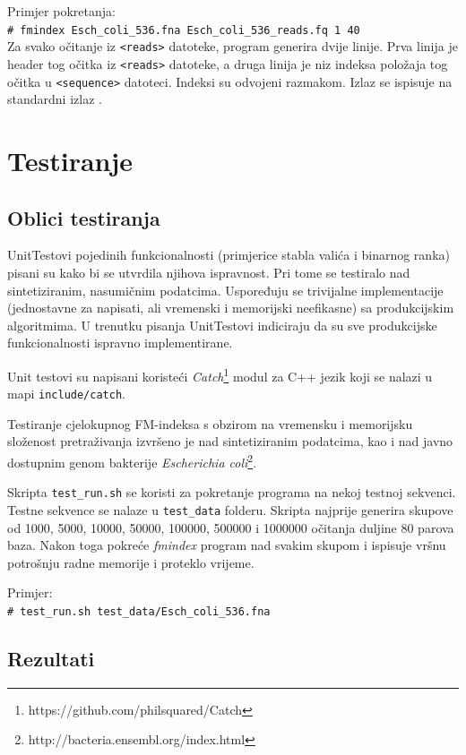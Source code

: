 \documentclass[times, utf8, seminar, numeric]{fer}
\newcommand{\shellcmd}[1]{\\\indent\indent\texttt{\footnotesize\# #1}\\}
\begin{document}
\noindent Primjer pokretanja:
\shellcmd{fmindex Esch\_coli\_536.fna Esch\_coli\_536\_reads.fq 1 40}

Za svako očitanje iz \texttt{<reads>} datoteke, program generira dvije linije. Prva linija je header tog očitka iz \texttt{<reads>} datoteke, a druga linija je niz indeksa položaja tog očitka u \texttt{<sequence>} datoteci. Indeksi su odvojeni razmakom. Izlaz se ispisuje na standardni izlaz .

\section{Testiranje}

\subsection{Oblici testiranja}

UnitTestovi pojedinih funkcionalnosti (primjerice stabla valića i binarnog ranka) pisani su
kako bi se utvrdila njihova ispravnost. Pri tome se testiralo nad sintetiziranim,
nasumičnim podatcima. Uspoređuju se trivijalne implementacije (jednostavne za napisati,
ali vremenski i memorijski neefikasne) sa produkcijskim algoritmima. U trenutku pisanja
UnitTestovi indiciraju da su sve produkcijske funkcionalnosti ispravno implementirane.

Unit testovi su napisani koristeći \textit{Catch}\footnote{https://github.com/philsquared/Catch} modul za C++ jezik koji se nalazi u mapi \texttt{include/catch}. 

Testiranje cjelokupnog FM-indeksa s obzirom na vremensku i memorijsku složenost
pretraživanja izvršeno je nad sintetiziranim podatcima, kao i nad 
javno dostupnim genom bakterije \textit{Escherichia coli}\footnote{http://bacteria.ensembl.org/index.html}.

Skripta \texttt{test\_run.sh} se koristi za pokretanje programa na nekoj testnoj sekvenci. Testne sekvence se nalaze u \texttt{test\_data} folderu. Skripta najprije generira skupove od 1000, 5000, 10000, 50000, 100000, 500000 i 1000000 očitanja  duljine 80 parova baza. Nakon toga pokreće \textit{fmindex} program nad svakim skupom i ispisuje vršnu potrošnju radne memorije i proteklo vrijeme.

\noindent Primjer:
\shellcmd{test\_run.sh test\_data/Esch\_coli\_536.fna}


\subsection{Rezultati}
\end{document}
